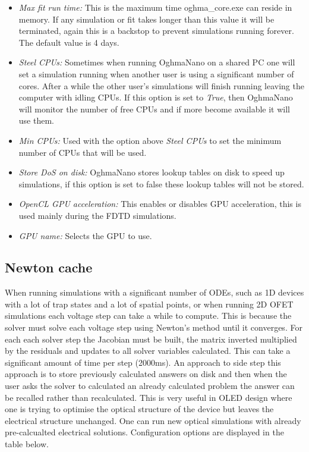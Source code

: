 \begin{itemize}
		\vspace{-0.2cm}\item \emph{Max fit run time:} This is the maximum time oghma\_core.exe can reside in memory. If any simulation or fit takes longer than this value it will be terminated, again this is a backstop to prevent simulations running forever.  The default value is 4 days. 
		\vspace{-0.2cm}\item \emph{Steel CPUs:} Sometimes when running OghmaNano on a shared PC one will set a simulation running when another user is using a significant number of cores. After a while the other user's simulations will finish running leaving the computer with idling CPUs. If this option is set to \emph{True}, then OghmaNano will monitor the number of free CPUs and if more become available it will use them.
		\vspace{-0.2cm}\item \emph{Min CPUs:} Used with the option above \emph{Steel CPUs} to set the minimum number of CPUs that will be used.
		\vspace{-0.2cm}\item \emph{Store DoS on disk:} OghmaNano stores lookup tables on disk to speed up simulations, if this option is set to false these lookup tables will not be stored.
		\vspace{-0.2cm}\item \emph{OpenCL GPU acceleration:} This enables or disables GPU acceleration, this is used mainly during the FDTD simulations.
		\vspace{-0.2cm}\item \emph{GPU name:} Selects the GPU to use.
	\end{itemize}

\subsection{Newton cache}

When running simulations with a significant number of ODEs, such as 1D devices with a lot of trap states and a lot of spatial points, or when running 2D OFET simulations each voltage step can take a while to compute. This is because the solver must solve each voltage step using Newton's method until it converges. For each each solver step the Jacobian must be built, the matrix inverted multiplied by the residuals and updates to all solver variables calculated. This can take a significant amount of time per step (2000ms). An approach to side step this approach is to store previously calculated answers on disk and then when the user asks the solver to calculated an already calculated problem the answer can be recalled rather than recalculated. This is very useful in OLED design where one is trying to optimise the optical structure of the device but leaves the electrical structure unchanged. One can run new optical simulations with already pre-calcualted electrical solutions.  Configuration options are displayed in the table below.

